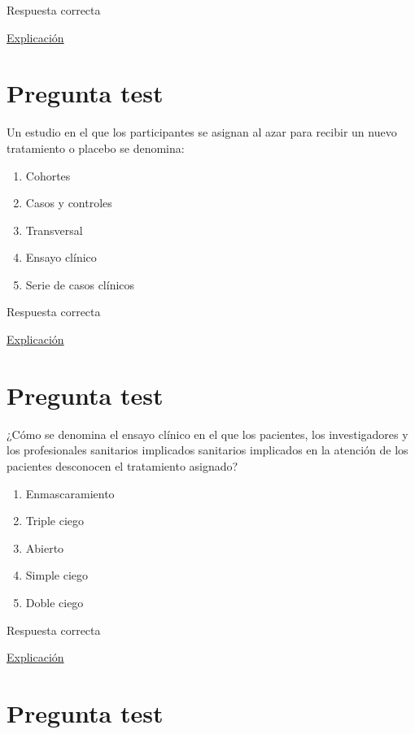 \documentclass[
]{book}
\providecommand{\tightlist}{%
  \setlength{\itemsep}{0pt}\setlength{\parskip}{0pt}}
\begin{document}
Respuesta correcta

\href{https://www.cancer.gov/espanol/publicaciones/diccionarios/diccionario-cancer/def/sesgo}{Explicación}

\hypertarget{pregunta-test-47}{%
\section{Pregunta test}\label{pregunta-test-47}}

Un estudio en el que los participantes se asignan al azar para recibir un nuevo tratamiento o placebo se denomina:

\begin{enumerate}
\def\labelenumi{\alph{enumi})}
\tightlist
\item
  Cohortes
\item
  Casos y controles
\item
  Transversal
\item
  Ensayo clínico
\item
  Serie de casos clínicos
\end{enumerate}

Respuesta correcta

\href{https://www.geicam.org/que-hacemos/ensayos-clinicos/que-es-un-ensayo-clinico}{Explicación}

\hypertarget{pregunta-test-48}{%
\section{Pregunta test}\label{pregunta-test-48}}

¿Cómo se denomina el ensayo clínico en el que los pacientes, los investigadores y los profesionales sanitarios implicados sanitarios implicados en la atención de los pacientes desconocen el tratamiento asignado?

\begin{enumerate}
\def\labelenumi{\alph{enumi})}
\tightlist
\item
  Enmascaramiento
\item
  Triple ciego
\item
  Abierto
\item
  Simple ciego
\item
  Doble ciego
\end{enumerate}

Respuesta correcta

\href{http://cv.uoc.edu/UOC/a/moduls/90/90_166d/web/main/m4/22d.html}{Explicación}

\hypertarget{pregunta-test-49}{%
\section{Pregunta test}\label{pregunta-test-49}}
\end{document}
